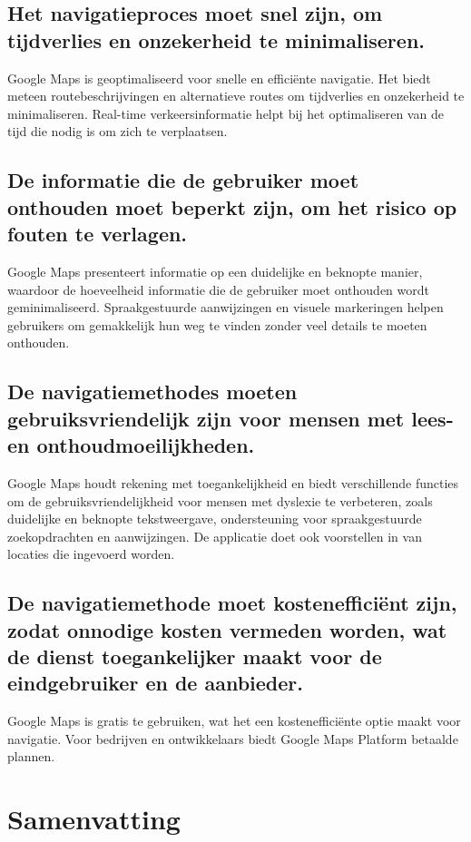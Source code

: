 \subsection*{Het navigatieproces moet snel zijn, om tijdverlies en onzekerheid te minimaliseren.}
Google Maps is geoptimaliseerd voor snelle en efficiënte navigatie. Het biedt meteen routebeschrijvingen en alternatieve routes om tijdverlies en onzekerheid te minimaliseren. Real-time verkeersinformatie helpt bij het optimaliseren van de tijd die nodig is om zich te verplaatsen.
\subsection*{De informatie die de gebruiker moet onthouden moet beperkt zijn, om het risico op fouten te verlagen.}
Google Maps presenteert informatie op een duidelijke en beknopte manier, waardoor de hoeveelheid informatie die de gebruiker moet onthouden wordt geminimaliseerd. Spraakgestuurde aanwijzingen en visuele markeringen helpen gebruikers om gemakkelijk hun weg te vinden zonder veel details te moeten onthouden.
\subsection*{De navigatiemethodes moeten gebruiksvriendelijk zijn voor mensen met lees- en onthoudmoeilijkheden.}
Google Maps houdt rekening met toegankelijkheid en biedt verschillende functies om de gebruiksvriendelijkheid voor mensen met dyslexie te verbeteren, zoals duidelijke en beknopte tekstweergave, ondersteuning voor spraakgestuurde zoekopdrachten en aanwijzingen. De applicatie doet ook voorstellen in van locaties die ingevoerd worden.
\subsection*{De navigatiemethode moet kostenefficiënt zijn, zodat onnodige kosten vermeden worden, wat de dienst toegankelijker maakt voor de eindgebruiker en de aanbieder.}
Google Maps is gratis te gebruiken, wat het een kostenefficiënte optie maakt voor navigatie. Voor bedrijven en ontwikkelaars biedt Google Maps Platform betaalde plannen.

\section{Samenvatting}
\label{sec:samenvatting}


